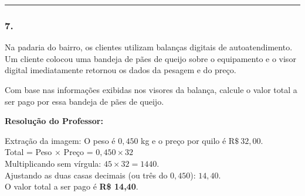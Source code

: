 \begin{multicols*}{2}
\noindent\textcolor{CorLinha}{\rule{\linewidth}{0.5pt}} 
\par\vspace{\espacoPreQuestao}
\subsubsection*{7.} Na padaria do bairro, os clientes utilizam balanças digitais de autoatendimento. Um cliente colocou uma bandeja de pães de queijo sobre o equipamento e o visor digital imediatamente retornou os dados da pesagem e do preço.
\begin{center}
\begin{adjustbox}{trim=0cm 0cm 0cm 0cm, clip, max width=\larguraTikz}
\end{adjustbox}
\end{center}
Com base nas informações exibidas nos visores da balança, calcule o valor total a ser pago por essa bandeja de pães de queijo.

\ifgabarito
    \begin{tcolorbox}[colback=CorTitUm!5, colframe=CorTitUm, boxrule=1pt, arc=4pt, left=6pt, right=6pt, top=6pt, bottom=6pt]
    \small\textbf{\textcolor{CorTitUm}{Resolução do Professor:}}\par\vspace{0.1cm}
    \color{CinzaEscuro}
    Extração da imagem: O peso é $ 0,450 $ kg e o preço por quilo é $ \text{R\$} \ 32,00 $.\\
    Total = Peso $\times$ Preço = $ 0,450 \times 32 $\\
    Multiplicando sem vírgula: $ 45 \times 32 = 1440 $.\\
    Ajustando as duas casas decimais (ou três do $0,450$): $ 14,40 $.\\
    O valor total a ser pago é \textbf{R\$ 14,40}.
    \end{tcolorbox}
\fi


\end{multicols*}
